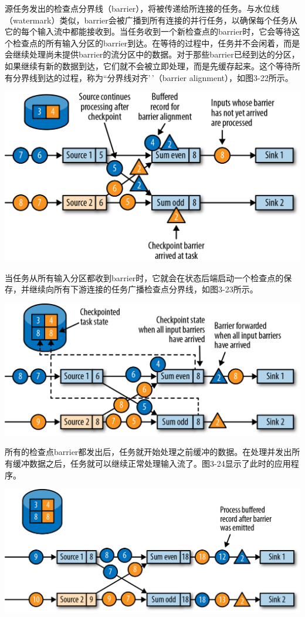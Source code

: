 \documentclass[cn,11pt,chinese]{elegantbook}
\begin{document}
源任务发出的检查点分界线（barrier），将被传递给所连接的任务。与水位线（watermark）类似，barrier会被广播到所有连接的并行任务，以确保每个任务从它的每个输入流中都能接收到。当任务收到一个新检查点的barrier时，它会等待这个检查点的所有输入分区的barrier到达。在等待的过程中，任务并不会闲着，而是会继续处理尚未提供barrier的流分区中的数据。对于那些barrier已经到达的分区，如果继续有新的数据到达，它们就不会被立即处理，而是先缓存起来。这个等待所有分界线到达的过程，称为``分界线对齐'\,'（barrier
alignment），如图3-22所示。

\includegraphics{images/spaf_0322.png}

当任务从所有输入分区都收到barrier时，它就会在状态后端启动一个检查点的保存，并继续向所有下游连接的任务广播检查点分界线，如图3-23所示。

\includegraphics{images/spaf_0323.png}

所有的检查点barrier都发出后，任务就开始处理之前缓冲的数据。在处理并发出所有缓冲数据之后，任务就可以继续正常处理输入流了。图3-24显示了此时的应用程序。

\includegraphics{images/spaf_0324.png}
\end{document}
